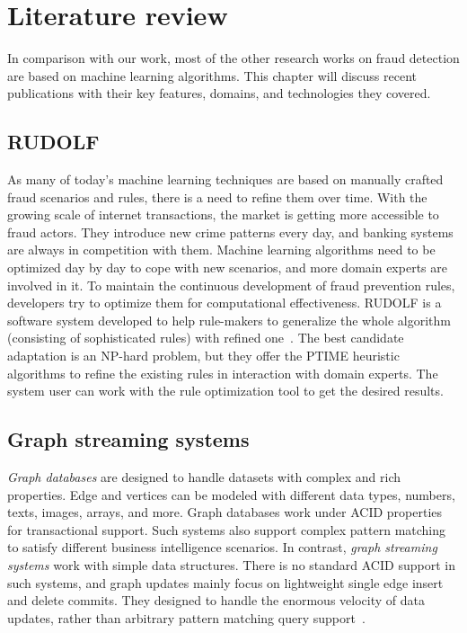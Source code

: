 \chapter{Literature review}

In comparison with our work, most of the other research works on fraud detection are based on machine learning algorithms.
This chapter will discuss recent publications with their key features, domains, and technologies they covered.

\section{RUDOLF}

As many of today's machine learning techniques are based on manually crafted fraud scenarios and rules, there is a need to refine them over time.
With the growing scale of internet transactions, the market is getting more accessible to fraud actors.
They introduce new crime patterns every day, and banking systems are always in competition with them. 
Machine learning algorithms need to be optimized day by day to cope with new scenarios, and more domain experts are involved in it.
To maintain the continuous development of fraud prevention rules, developers try to optimize them for computational effectiveness.
RUDOLF is a software system developed to help rule-makers to generalize the whole algorithm (consisting of sophisticated rules) with refined one~\cite{DBLP:conf/edbt/MiloNT18}.
The best candidate adaptation is an NP-hard problem, but they offer the PTIME heuristic algorithms to refine the existing rules in interaction with domain experts.
The system user can work with the rule optimization tool to get the desired results.

\section{Graph streaming systems}

\emph{Graph databases} are designed to handle datasets with complex and rich properties.
Edge and vertices can be modeled with different data types, numbers, texts, images, arrays, and more.
Graph databases work under ACID properties for transactional support.
Such systems also support complex pattern matching to satisfy different business intelligence scenarios.
In contrast, \emph{graph streaming systems} work with simple data structures.
There is no standard ACID support in such systems, and graph updates mainly focus on lightweight single edge insert and delete commits.
They designed to handle the enormous velocity of data updates, rather than arbitrary pattern matching query support~\cite{DBLP:journals/corr/abs-1912-12740}.

